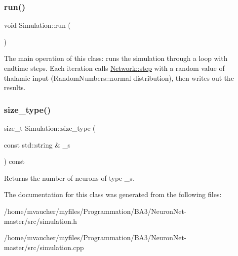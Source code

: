 \subsubsection{\texorpdfstring{run()}{run()}}
{\footnotesize\ttfamily void Simulation\+::run (\begin{DoxyParamCaption}{ }\end{DoxyParamCaption})}

The main operation of this class\+: runs the simulation through a loop with endtime steps. Each iteration calls \hyperlink{classNetwork_a53665a3a69e6ec894c313d0ce3fb7f34}{Network\+::step} with a random value of thalamic input (Random\+Numbers\+::normal distribution), then writes out the results. \mbox{\label{classSimulation_a7d0ca858dfec187001ecbab2081f9d04}} 
\subsubsection{\texorpdfstring{size\+\_\+type()}{size\_type()}}
{\footnotesize\ttfamily size\+\_\+t Simulation\+::size\+\_\+type (\begin{DoxyParamCaption}\item[{const std\+::string \&}]{\+\_\+s }\end{DoxyParamCaption}) const}

Returns the number of neurons of type \+\_\+s. 

The documentation for this class was generated from the following files\+:\begin{DoxyCompactItemize}
\item 
/home/mvaucher/myfiles/\+Programmation/\+B\+A3/\+Neuron\+Net-\/master/src/simulation.\+h\item 
/home/mvaucher/myfiles/\+Programmation/\+B\+A3/\+Neuron\+Net-\/master/src/simulation.\+cpp\end{DoxyCompactItemize}
